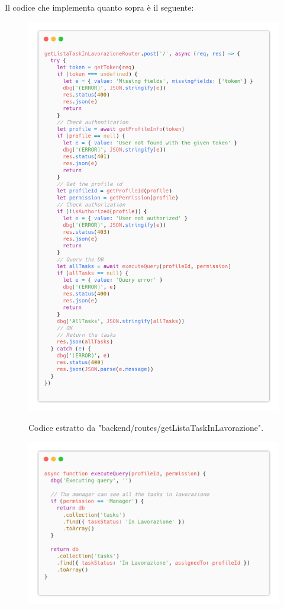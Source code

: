 \documentclass{report}
\begin{document}
Il codice che implementa quanto sopra è il seguente:

\begin{figure}[H]
	\centering\includegraphics[width=1\textwidth]{images/code_in_lavorazione.png}
	
	Codice estratto da "backend/routes/getListaTaskInLavorazione".
\end{figure}
\begin{figure}[H]
	\centering\includegraphics[width=1\textwidth]{images/code_in_lavorazione2.png}
\end{figure}
\end{document}
